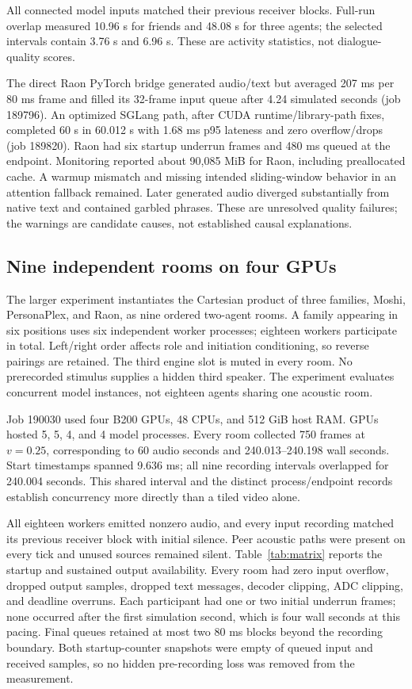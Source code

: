 \documentclass{article}
\begin{document}
All connected model inputs matched their previous receiver blocks. Full-run overlap measured 10.96 s for friends and 48.08 s for three agents; the selected intervals contain 3.76 s and 6.96 s. These are activity statistics, not dialogue-quality scores.

The direct Raon PyTorch bridge generated audio/text but averaged 207 ms per 80 ms frame and filled its 32-frame input queue after 4.24 simulated seconds (job 189796). An optimized SGLang path, after CUDA runtime/library-path fixes, completed 60 s in 60.012 s with 1.68 ms p95 lateness and zero overflow/drops (job 189820). Raon had six startup underrun frames and 480 ms queued at the endpoint. Monitoring reported about 90,085 MiB for Raon, including preallocated cache. A warmup mismatch and missing intended sliding-window behavior in an attention fallback remained. Later generated audio diverged substantially from native text and contained garbled phrases. These are unresolved quality failures; the warnings are candidate causes, not established causal explanations.

\subsection{Nine independent rooms on four GPUs}
\label{sec:matrix}
The larger experiment instantiates the Cartesian product of three families, Moshi, PersonaPlex, and Raon, as nine ordered two-agent rooms. A family appearing in six positions uses six independent worker processes; eighteen workers participate in total. Left/right order affects role and initiation conditioning, so reverse pairings are retained. The third engine slot is muted in every room. No prerecorded stimulus supplies a hidden third speaker. The experiment evaluates concurrent model instances, not eighteen agents sharing one acoustic room.

Job 190030 used four B200 GPUs, 48 CPUs, and 512 GiB host RAM. GPUs hosted 5, 5, 4, and 4 model processes. Every room collected 750 frames at $v=0.25$, corresponding to 60 audio seconds and 240.013--240.198 wall seconds. Start timestamps spanned 9.636 ms; all nine recording intervals overlapped for 240.004 seconds. This shared interval and the distinct process/endpoint records establish concurrency more directly than a tiled video alone.

All eighteen workers emitted nonzero audio, and every input recording matched its previous receiver block with initial silence. Peer acoustic paths were present on every tick and unused sources remained silent. Table~\ref{tab:matrix} reports the startup and sustained output availability. Every room had zero input overflow, dropped output samples, dropped text messages, decoder clipping, ADC clipping, and deadline overruns. Each participant had one or two initial underrun frames; none occurred after the first simulation second, which is four wall seconds at this pacing. Final queues retained at most two 80 ms blocks beyond the recording boundary. Both startup-counter snapshots were empty of queued input and received samples, so no hidden pre-recording loss was removed from the measurement.
\end{document}
